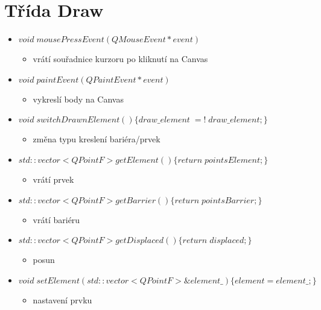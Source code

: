 \documentclass[oneside,12pt,a4paper]{book}
\begin{document}
   \section{Třída Draw} 
    \begin{itemize}
    
    \item $void\; mousePressEvent(QMouseEvent *event)$
     \begin{itemize}
     \item  vrátí souřadnice kurzoru po kliknutí na Canvas
     \end{itemize}
     
    \item $void\; paintEvent(QPaintEvent *event)$
    \begin{itemize}
    \item  vykreslí body na Canvas
    \end{itemize}
    
    \item $void\; switchDrawnElement()\{draw\_element\;=!\;draw\_element;\}$
    \begin{itemize}
    \item  změna typu kreslení bariéra/prvek
    \end{itemize}

    \item $std::vector<QPointF>getElement()\{return \; pointsElement;\}$
    \begin{itemize}
    \item vrátí prvek
    \end{itemize}
    
    \item $std::vector<QPointF>getBarrier()\{return\; pointsBarrier;\}$
    \begin{itemize}
    \item  vrátí bariéru
    \end{itemize}

    \item $std::vector<QPointF>getDisplaced()\{return\; displaced;\}$
    \begin{itemize}
    \item  posun
    \end{itemize}

    \item $void\; setElement(std::vector<QPointF> \&element\_)\{element=element\_;\}$
    \begin{itemize}
    \item  nastavení prvku
    \end{itemize}


\end{itemize}
\end{document}
